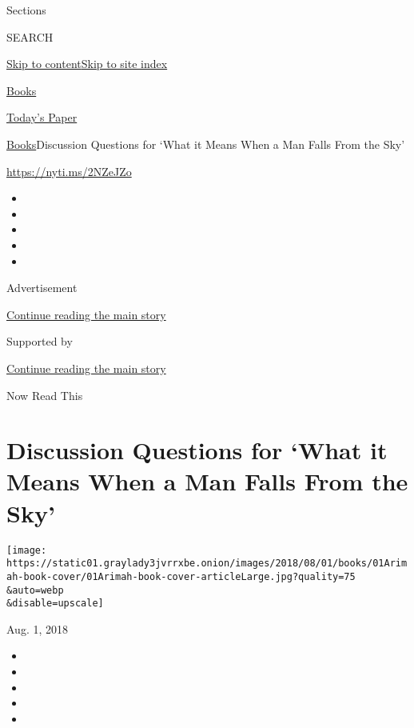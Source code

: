 Sections

SEARCH

\protect\hyperlink{site-content}{Skip to
content}\protect\hyperlink{site-index}{Skip to site index}

\href{https://www.nytimes3xbfgragh.onion/section/books}{Books}

\href{https://myaccount.nytimes3xbfgragh.onion/auth/login?response_type=cookie\&client_id=vi}{}

\href{https://www.nytimes3xbfgragh.onion/section/todayspaper}{Today's
Paper}

\href{/section/books}{Books}\textbar{}Discussion Questions for `What it
Means When a Man Falls From the Sky'

\url{https://nyti.ms/2NZeJZo}

\begin{itemize}
\item
\item
\item
\item
\item
\end{itemize}

Advertisement

\protect\hyperlink{after-top}{Continue reading the main story}

Supported by

\protect\hyperlink{after-sponsor}{Continue reading the main story}

Now Read This

\hypertarget{discussion-questions-for-what-it-means-when-a-man-falls-from-the-sky}{%
\section{Discussion Questions for `What it Means When a Man Falls From
the
Sky'}\label{discussion-questions-for-what-it-means-when-a-man-falls-from-the-sky}}

\texttt{[image: https://static01.graylady3jvrrxbe.onion/images/2018/08/01/books/01Arimah-book-cover/01Arimah-book-cover-articleLarge.jpg?quality=75\\\&auto=webp\\\&disable=upscale]}

Aug. 1, 2018

\begin{itemize}
\item
\item
\item
\item
\item
\end{itemize}

